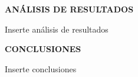 \documentclass[12pt]{article}
\begin{document}
	\newpage
	
	\begin{center}
		\textbf{\large ANÁLISIS DE RESULTADOS}\\
	\end{center}
	
	Inserte análisis de resultados
	
	\newpage
	
	\begin{center}
		\textbf{\large CONCLUSIONES}\\
	\end{center}
	
	Inserte conclusiones
	
	\newpage
	
\end{document}
